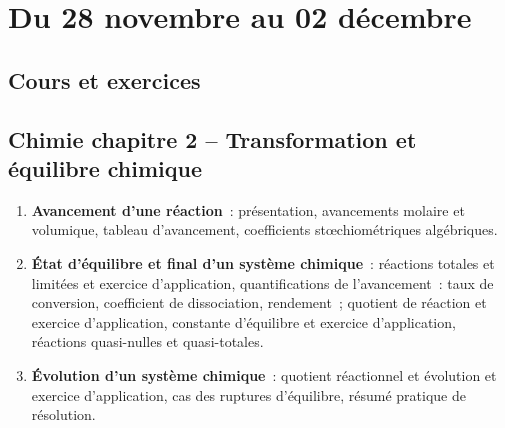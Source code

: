 \documentclass[a4paper, 12pt, final, garamond]{book}
\begin{document}
\setcounter{chapter}{9}

\chapter{Du 28 novembre au 02 d\'ecembre}

\section{Cours et exercices}
\section*{Chimie chapitre 2 -- Transformation et équilibre chimique}
\begin{enumerate}[label=\Roman*]
    \item \textbf{Avancement d'une réaction}~: présentation, avancements molaire
        et volumique, tableau d'avancement, coefficients stœchiométriques
        algébriques.
    \item \textbf{État d'équilibre et final d'un système chimique}~: réactions
        totales et limitées et exercice d'application, quantifications de
        l'avancement~: taux de conversion, coefficient de dissociation,
        rendement~; quotient de réaction et exercice d'application, constante
        d'équilibre et exercice d'application, réactions quasi-nulles et
        quasi-totales.
    \item \textbf{Évolution d'un système chimique}~: quotient réactionnel et
        évolution et exercice d'application, cas des ruptures d'équilibre,
        résumé pratique de résolution.
\end{enumerate}
\end{document}
